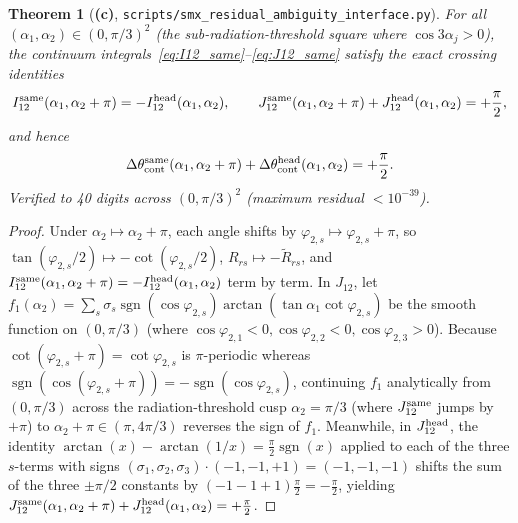 \documentclass[11pt,a4paper]{article}
\newcommand{\Lc}{\textsf{\textbf{(c)}}}
\newcommand{\smxamb}{\texttt{scripts/\allowbreak smx\_\allowbreak residual\_\allowbreak ambiguity\_\allowbreak interface.py}}
\DeclareMathOperator{\sgn}{sgn}
\newtheorem{theorem}[proposition]{Theorem}
\theoremstyle{remark}
\begin{document}
\begin{theorem}[\Lc, \smxamb]\label{thm:IJ_crossing}
For all $(\alpha_1,\alpha_2)\in(0,\pi/3)^2$ (the sub-radiation-threshold square where $\cos 3\alpha_j>0$), the continuum integrals~\eqref{eq:I12_same}--\eqref{eq:J12_same} satisfy the exact crossing identities
\begin{equation}\label{eq:IJ_crossing}
I_{12}^{\rm same}(\alpha_1,\alpha_2+\pi)=-I_{12}^{\rm head}(\alpha_1,\alpha_2),\qquad
J_{12}^{\rm same}(\alpha_1,\alpha_2+\pi)+J_{12}^{\rm head}(\alpha_1,\alpha_2)=+\frac\pi2,
\end{equation}
and hence
\begin{equation}\label{eq:Delta_theta_crossing}
\Delta\theta_{\rm cont}^{\rm same}(\alpha_1,\alpha_2+\pi)+\Delta\theta_{\rm cont}^{\rm head}(\alpha_1,\alpha_2)=+\frac\pi2.
\end{equation}
Verified to 40 digits across $(0,\pi/3)^2$ (maximum residual $<10^{-39}$).
\end{theorem}

\begin{proof}
Under $\alpha_2\mapsto\alpha_2+\pi$, each angle shifts by $\varphi_{2,s}\mapsto\varphi_{2,s}+\pi$, so $\tan(\varphi_{2,s}/2)\mapsto -\cot(\varphi_{2,s}/2)$, $R_{rs}\mapsto -\tilde R_{rs}$, and $I_{12}^{\rm same}(\alpha_1,\alpha_2+\pi)=-I_{12}^{\rm head}(\alpha_1,\alpha_2)$ term by term. In $J_{12}$, let $f_1(\alpha_2)=\sum_s\sigma_s\sgn(\cos\varphi_{2,s})\arctan(\tan\alpha_1\cot\varphi_{2,s})$ be the smooth function on $(0,\pi/3)$ (where $\cos\varphi_{2,1}<0,\cos\varphi_{2,2}<0,\cos\varphi_{2,3}>0$). Because $\cot(\varphi_{2,s}+\pi)=\cot\varphi_{2,s}$ is $\pi$-periodic whereas $\sgn(\cos(\varphi_{2,s}+\pi))=-\sgn(\cos\varphi_{2,s})$, continuing $f_1$ analytically from $(0,\pi/3)$ across the radiation-threshold cusp $\alpha_2=\pi/3$ (where $J_{12}^{\rm same}$ jumps by $+\pi$) to $\alpha_2+\pi\in(\pi,4\pi/3)$ reverses the sign of $f_1$. Meanwhile, in $J_{12}^{\rm head}$, the identity $\arctan(x)-\arctan(1/x)=\frac\pi2\sgn(x)$ applied to each of the three $s$-terms with signs $(\sigma_1,\sigma_2,\sigma_3)\cdot(-1,-1,+1)=(-1,-1,-1)$ shifts the sum of the three $\pm\pi/2$ constants by $(-1-1+1)\frac\pi2=-\frac\pi2$, yielding $J_{12}^{\rm same}(\alpha_1,\alpha_2+\pi)+J_{12}^{\rm head}(\alpha_1,\alpha_2)=+\frac\pi2$.
\end{proof}
\end{document}
